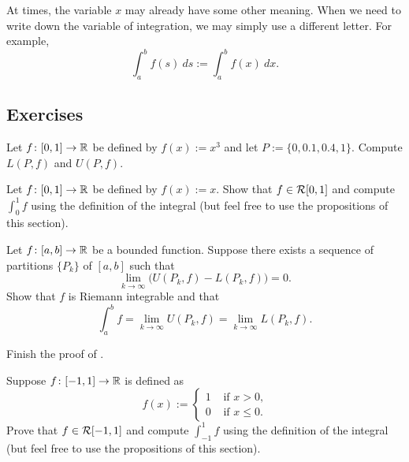 At times, the variable $x$ may already have some other meaning.  When
we need to write down the variable of integration, we may simply
use a different letter.  For example,
\begin{equation*}
\int_a^b f(s)~ds := \int_a^b f(x)~dx .
\end{equation*}

\subsection{Exercises}

\begin{exercise}
Let $f \colon [0,1] \to {\mathbb{R}}$ be defined by $f(x) := x^3$
and let $P := \{ 0, 0.1, 0.4, 1 \}$.  Compute $L(P,f)$ and $U(P,f)$.
\end{exercise}

\begin{exercise}
Let $f \colon [0,1] \to {\mathbb{R}}$ be defined by $f(x) := x$.
Show that $f \in {\mathcal{R}}[0,1]$ and
compute $\int_0^1 f$ using the definition of the integral
(but
feel free to use the propositions of this section).%
\end{exercise}

\begin{exercise}
Let $f \colon [a,b] \to {\mathbb{R}}$ be a bounded function.
Suppose there exists a sequence of partitions $\{ P_k \}$ of $[a,b]$
such that
\begin{equation*}
\lim_{k \to \infty} \bigl( U(P_k,f) - L(P_k,f) \bigr) = 0 .
\end{equation*}
Show that $f$ is Riemann integrable and that
\begin{equation*}
\int_a^b f = 
\lim_{k \to \infty} U(P_k,f)
=
\lim_{k \to \infty} L(P_k,f) .
\end{equation*}
\end{exercise}

\begin{exercise}
Finish the proof of .
\end{exercise}

\begin{exercise}
Suppose $f \colon [-1,1] \to {\mathbb{R}}$ is defined as
\begin{equation*}
f(x) :=
\begin{cases}
1 & \text{ if $x > 0$,} \\
0 & \text{ if $x \leq 0$.}
\end{cases}
\end{equation*}
Prove that $f \in {\mathcal{R}}[-1,1]$ and
compute $\int_{-1}^1 f$ using the definition of the integral
(but
feel free to use the propositions of this section).
\end{exercise}


